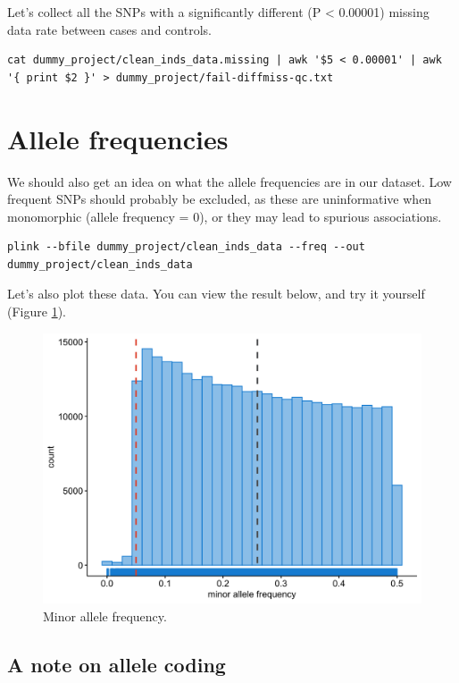 \documentclass[
]{book}
\begin{document}
Let's collect all the SNPs with a significantly different (P \textless{} 0.00001) missing data rate between cases and controls.

\begin{lstlisting}
cat dummy_project/clean_inds_data.missing | awk '$5 < 0.00001' | awk '{ print $2 }' > dummy_project/fail-diffmiss-qc.txt
\end{lstlisting}

\hypertarget{allele-frequencies}{%
\section{Allele frequencies}\label{allele-frequencies}}

We should also get an idea on what the allele frequencies are in our dataset. Low frequent SNPs should probably be excluded, as these are uninformative when monomorphic (allele frequency = 0), or they may lead to spurious associations.

\begin{lstlisting}
plink --bfile dummy_project/clean_inds_data --freq --out dummy_project/clean_inds_data
\end{lstlisting}

Let's also plot these data. You can view the result below, and try it yourself (Figure \ref{fig:showfreq}).

\begin{figure}[H]

{\centering \includegraphics[width=0.85\linewidth]{img/_gwas_dummy/show-freq} 

}

\caption{Minor allele frequency.}\label{fig:showfreq}
\end{figure}

\hypertarget{a-note-on-allele-coding}{%
\subsection{A note on allele coding}\label{a-note-on-allele-coding}}
\end{document}
